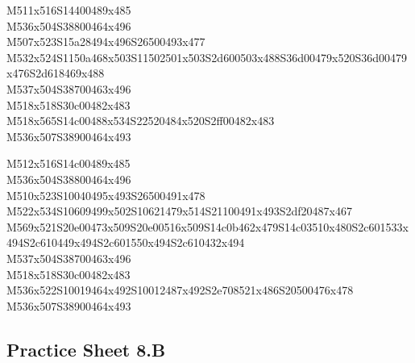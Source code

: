 \documentclass{article}
\begin{document}
\begin{multicols}{5}
\begin{center}
M511x516S14400489x485 %
\\M536x504S38800464x496 %
\\M507x523S15a28494x496S26500493x477 %
\\M532x524S1150a468x503S11502501x503S2d600503x488S36d00479x520S36d00479x476S2d618469x488 %
\\M537x504S38700463x496 %
\\M518x518S30c00482x483 %
\\M518x565S14c00488x534S22520484x520S2ff00482x483 %
\\M536x507S38900464x493 %
\vfil
\columnbreak

M512x516S14c00489x485 %
\\M536x504S38800464x496 %
\\M510x523S10040495x493S26500491x478 %
\\M522x534S10609499x502S10621479x514S21100491x493S2df20487x467 %
\\M569x521S20e00473x509S20e00516x509S14c0b462x479S14c03510x480S2c601533x494S2c610449x494S2c601550x494S2c610432x494 %
\\M537x504S38700463x496 %
\\M518x518S30c00482x483 %
\\M536x522S10019464x492S10012487x492S2e708521x486S20500476x478 %
\\M536x507S38900464x493 %
\vfil

\end{center}
\end{multicols}

\subsection{Practice Sheet 8.B}
\end{document}
